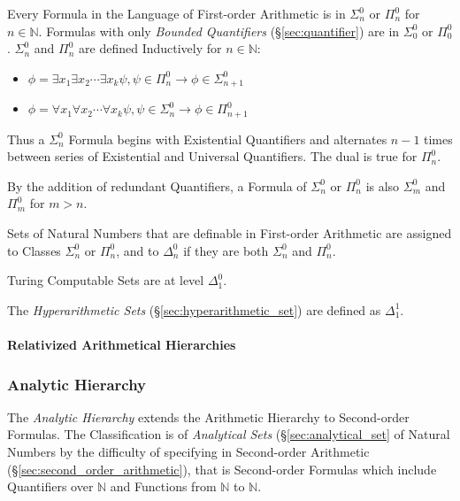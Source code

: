 Every Formula in the Language of First-order Arithmetic is in
$\Sigma^0_n$ or $\Pi^0_n$ for $n \in \mathbb{N}$. Formulas with only
\emph{Bounded Quantifiers} (\S\ref{sec:quantifier}) are in
$\Sigma^0_0$ or $\Pi^0_0$. $\Sigma^0_n$ and $\Pi^0_n$ are defined
Inductively for $n \in \mathbb{N}$:

\begin{itemize}
  \item $\phi = \exists x_1 \exists x_2 \cdots \exists x_k\psi, \psi
    \in \Pi^0_n \rightarrow \phi \in \Sigma^0_{n+1}$
  \item $\phi = \forall x_1 \forall x_2 \cdots \forall x_k\psi, \psi
    \in \Sigma^0_n \rightarrow \phi \in \Pi^0_{n+1}$
\end{itemize}

Thus a $\Sigma^0_n$ Formula begins with Existential Quantifiers and
alternates $n-1$ times between series of Existential and Universal
Quantifiers. The dual is true for $\Pi^0_n$.

By the addition of redundant Quantifiers, a Formula of $\Sigma^0_n$ or
$\Pi^0_n$ is also $\Sigma^0_m$ and $\Pi^0_m$ for $m > n$.

Sets of Natural Numbers that are definable in First-order Arithmetic
are assigned to Classes $\Sigma^0_n$ or $\Pi^0_n$, and to $\Delta^0_n$
if they are both $\Sigma^0_n$ and $\Pi^0_n$.

Turing Computable Sets are at level $\Delta^0_1$.

The \emph{Hyperarithmetic Sets} (\S\ref{sec:hyperarithmetic_set})
are defined as $\Delta^1_1$.

\paragraph{Relativized Arithmetical Hierarchies}\hfill



\subsubsection{Analytic Hierarchy}\label{sec:analytic_hierarchy}

The \emph{Analytic Hierarchy} extends the Arithmetic Hierarchy to
Second-order Formulas. The Classification is of \emph{Analytical Sets}
(\S\ref{sec:analytical_set} of Natural Numbers by the difficulty of
specifying in Second-order Arithmetic
(\S\ref{sec:second_order_arithmetic}), that is Second-order Formulas which
include Quantifiers over $\mathbb{N}$ and Functions from $\mathbb{N}$
to $\mathbb{N}$.

